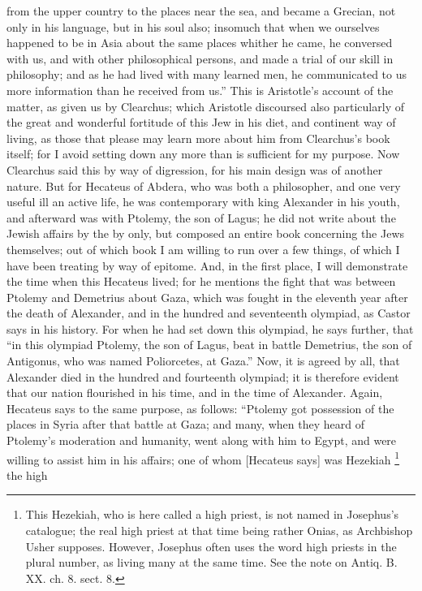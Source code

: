 from the upper country to the places near the sea, and became a Grecian,
not only in his language, but in his soul also; insomuch that when we
ourselves happened to be in Asia about the same places whither he came, he
conversed with us, and with other philosophical persons, and made a trial
of our skill in philosophy; and as he had lived with many learned men, he
communicated to us more information than he received from us.'' This is
Aristotle's account of the matter, as given us by Clearchus; which
Aristotle discoursed also particularly of the great and wonderful
fortitude of this Jew in his diet, and continent way of living, as those
that please may learn more about him from Clearchus's book itself; for I
avoid setting down any more than is sufficient for my purpose. Now
Clearchus said this by way of digression, for his main design was of
another nature. But for Hecateus of Abdera, who was both a philosopher,
and one very useful ill an active life, he was contemporary with king
Alexander in his youth, and afterward was with Ptolemy, the son of Lagus;
he did not write about the Jewish affairs by the by only, but composed an
entire book concerning the Jews themselves; out of which book I am willing
to run over a few things, of which I have been treating by way of epitome.
And, in the first place, I will demonstrate the time when this Hecateus
lived; for he mentions the fight that was between Ptolemy and Demetrius
about Gaza, which was fought in the eleventh year after the death of
Alexander, and in the hundred and seventeenth olympiad, as Castor says in
his history. For when he had set down this olympiad, he says further, that
``in this olympiad Ptolemy, the son of Lagus, beat in battle Demetrius, the
son of Antigonus, who was named Poliorcetes, at Gaza.'' Now, it is agreed
by all, that Alexander died in the hundred and fourteenth olympiad; it is
therefore evident that our nation flourished in his time, and in the time
of Alexander. Again, Hecateus says to the same purpose, as follows:
``Ptolemy got possession of the places in Syria after that battle at Gaza;
and many, when they heard of Ptolemy's moderation and humanity, went along
with him to Egypt, and were willing to assist him in his affairs; one of
whom [Hecateus says] was Hezekiah \footnote{This Hezekiah, who is
here called a high priest, is not named in Josephus's catalogue; the real
high priest at that time being rather Onias, as Archbishop Usher supposes.
However, Josephus often uses the word high priests in the plural number,
as living many at the same time. See the note on Antiq. B. XX. ch. 8.
sect. 8.} the high

